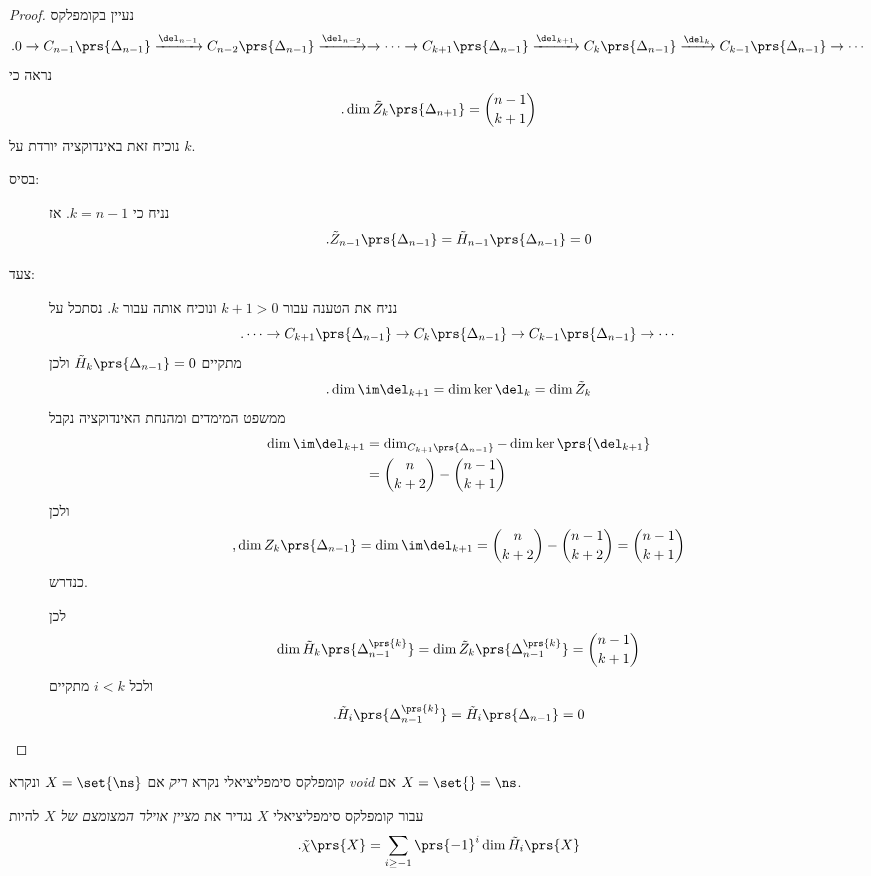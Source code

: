 \documentclass[a4paper,10pt,twoside,openany]{book}
\begin{document}
\begin{proof}
נעיין בקומפלקס
\[\text{.} 0 \to C_{n-1} \prs{\Delta_{n-1}} \xrightarrow{\del_{n-1}} C_{n-2}\prs{\Delta_{n-1}} \xrightarrow{\del_{n-2}} \to \cdots \to C_{k+1}\prs{\Delta_{n-1}} \xrightarrow{\del_{k+1}} C_k\prs{\Delta_{n-1}} \xrightarrow{\del_k} C_{k-1}\prs{\Delta_{n-1}} \to \cdots\]
נראה כי
\[\text{.} \dim \tilde{Z}_k\prs{\Delta_{n+1}} = \binom{n-1}{k+1}\]
נוכיח זאת באינדוקציה יורדת על
$k$.

\begin{description}
\item[בסיס:]
נניח כי
$k = n-1$.
אז
\[\text{.} \tilde{Z}_{n-1}\prs{\Delta_{n-1}} = \tilde{H}_{n-1}\prs{\Delta_{n-1}} = 0\]
\item[צעד:]
נניח את הטענה עבור
$k+1 > 0$
ונוכיח אותה עבור
$k$.
נסתכל על
\[\text{.} \cdots \to C_{k+1} \prs{\Delta_{n-1}} \to C_k\prs{\Delta_{n-1}} \to C_{k-1} \prs{\Delta_{n-1}} \to \cdots\]
מתקיים
$\tilde{H}_k\prs{\Delta_{n-1}} = 0$
ולכן
\[\text{.} \dim \im \del_{k+1} = \dim \ker \del_k = \dim \tilde{Z}_k\]
ממשפט המימדים ומהנחת האינדוקציה נקבל
\begin{align*}
\dim \im \del_{k+1} &= \dim_{C_{k+1}\prs{\Delta_{n-1}}} - \dim \ker\prs{\del_{k+1}}
\\&=
\binom{n}{k+2} - \binom{n-1}{k+1}
\end{align*}
ולכן
\begin{align*}
\text{,} \dim Z_k\prs{\Delta_{n-1}} = \dim \im \del_{k+1} = \binom{n}{k+2} - \binom{n-1}{k+2} = \binom{n-1}{k+1}
\end{align*}
כנדרש.

לכן
\begin{align*}
\dim \tilde{H}_k\prs{\Delta_{n-1}^{\prs{k}}} = \dim \tilde{Z}_k\prs{\Delta_{n-1}^{\prs{k}}} = \binom{n-1}{k+1}
\end{align*}
ולכל
$i<k$
מתקיים
\begin{align*}
\text{.} \tilde{H}_i \prs{\Delta_{n-1}^{\prs{k}}} = \tilde{H}_i \prs{\Delta_{n-1}} = 0
\end{align*}
\end{description}

\end{proof}

\begin{definition}[קומפלקס]
קומפלקס סימפליציאלי נקרא
\emph{ריק}
אם
$X = \set{\ns}$
ונקרא
\emph{\textenglish{void}}
אם
$X = \set{} = \ns$.
\end{definition}

\begin{definition}
עבור קומפלקס סימפליציאלי
$X$
נגדיר את
\emph{מציין אוילר המצומצם של
$X$}
להיות
\begin{align*}
\text{.} \tilde{\chi}\prs{X} = \sum_{i \geq -1} \prs{-1}^i \dim \tilde{H}_i\prs{X}
\end{align*}
\end{definition}
\end{document}
